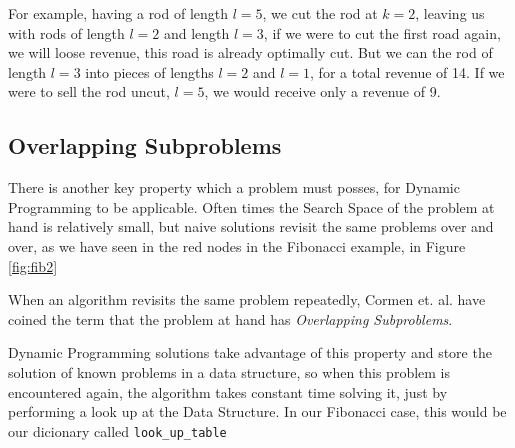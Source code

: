 For example, having a rod of length $l = 5$, we cut the rod at $k = 2$, leaving us with rods of length
$l = 2$ and length $l = 3$, if we were to cut the first road again, we will loose revenue, this road is already
optimally cut. But we can the rod of length $l = 3$ into pieces of lengths $l = 2$ and $l = 1$, for a total revenue of
14. If we were to sell the rod uncut, $l = 5$,  we would receive only a revenue of 9.


\subsection{Overlapping Subproblems}

There is another key property which a problem must posses, for Dynamic Programming to
be applicable. Often times the Search Space of the problem at hand is relatively small,
but naive solutions revisit the same problems over and over, as we have seen in the red
nodes in the Fibonacci example, in Figure \ref{fig:fib2}

When an algorithm revisits the same problem repeatedly, Cormen et. al. have coined the term
that the problem at hand has \emph{Overlapping Subproblems}.

Dynamic Programming solutions take advantage of this property and store the solution
of known problems in a data structure, so when this problem is encountered again, 
the algorithm takes constant time solving it, just by performing a look up at the Data
Structure. In our Fibonacci case, this would be our dicionary called \texttt{look\_up\_table}